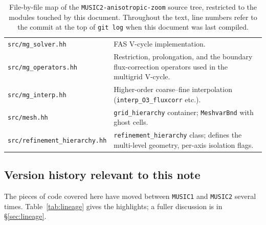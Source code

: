 \documentclass[12pt]{article}
\newcommand{\code}[1]{\texttt{#1}}
\begin{document}
\begin{table}[h]
\begin{tabular}{lp{}}
\code{src/mg\_solver.hh}          & FAS V-cycle implementation. \\
\code{src/mg\_operators.hh}       & Restriction, prolongation, and the boundary flux-correction operators used in the multigrid V-cycle. \\
\code{src/mg\_interp.hh}          & Higher-order coarse--fine interpolation (\code{interp\_O3\_fluxcorr} etc.). \\
\code{src/mesh.hh}                & \code{grid\_hierarchy} container; \code{MeshvarBnd} with ghost cells. \\
\code{src/refinement\_hierarchy.hh} & \code{refinement\_hierarchy} class; defines the multi-level geometry, per-axis isolation flags. \\
\bottomrule
\end{tabular}
\caption{File-by-file map of the \texttt{MUSIC2-anisotropic-zoom}
         source tree, restricted to the modules touched by this
         document.  Throughout the text, line numbers refer to the
         commit at the top of \texttt{git log} when this document was
         last compiled.}
\label{tab:source-map}
\end{table}

\subsection{Version history relevant to this note}
\label{sec:lineage-summary}

The pieces of code covered here have moved between \texttt{MUSIC1}
and \texttt{MUSIC2} several times.  Table~\ref{tab:lineage} gives
the highlights; a fuller discussion is in \S\ref{sec:lineage}.
\end{document}
